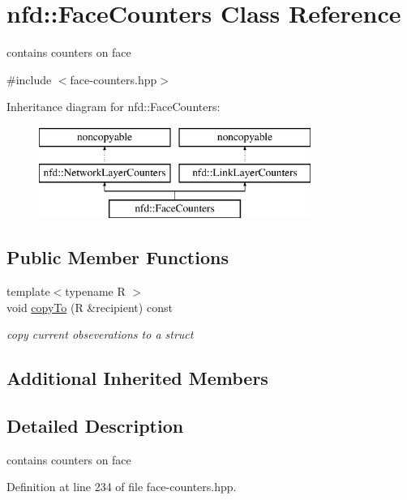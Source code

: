 \hypertarget{classnfd_1_1FaceCounters}{}\section{nfd\+:\+:Face\+Counters Class Reference}
\label{classnfd_1_1FaceCounters}


contains counters on face  




{\ttfamily \#include $<$face-\/counters.\+hpp$>$}

Inheritance diagram for nfd\+:\+:Face\+Counters\+:\begin{figure}[H]
\begin{center}
\leavevmode
\includegraphics[height=3.000000cm]{classnfd_1_1FaceCounters}
\end{center}
\end{figure}
\subsection*{Public Member Functions}
\begin{DoxyCompactItemize}
\item 
{\footnotesize template$<$typename R $>$ }\\void \hyperlink{classnfd_1_1FaceCounters_a059772ebfa28070240cee2db099a3556}{copy\+To} (R \&recipient) const
\begin{DoxyCompactList}\small\item\em copy current obseverations to a struct \end{DoxyCompactList}\end{DoxyCompactItemize}
\subsection*{Additional Inherited Members}


\subsection{Detailed Description}
contains counters on face 

Definition at line 234 of file face-\/counters.\+hpp.



